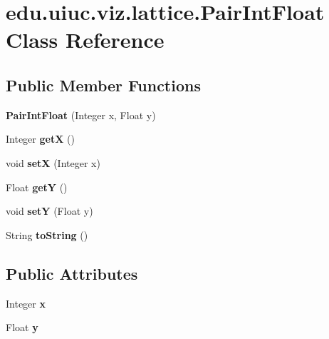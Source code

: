 \hypertarget{classedu_1_1uiuc_1_1viz_1_1lattice_1_1_pair_int_float}{}\section{edu.\+uiuc.\+viz.\+lattice.\+Pair\+Int\+Float Class Reference}
\label{classedu_1_1uiuc_1_1viz_1_1lattice_1_1_pair_int_float}
\subsection*{Public Member Functions}
\begin{DoxyCompactItemize}
\item 
\mbox{\label{classedu_1_1uiuc_1_1viz_1_1lattice_1_1_pair_int_float_a962588ce1ce34cc83889f68fc17846a9}} 
{\bfseries Pair\+Int\+Float} (Integer x, Float y)
\item 
\mbox{\label{classedu_1_1uiuc_1_1viz_1_1lattice_1_1_pair_int_float_a8431287a1ab3f4aa9521a6b7fe7ad163}} 
Integer {\bfseries getX} ()
\item 
\mbox{\label{classedu_1_1uiuc_1_1viz_1_1lattice_1_1_pair_int_float_ae7b02985752132e7c1141aeac4d572be}} 
void {\bfseries setX} (Integer x)
\item 
\mbox{\label{classedu_1_1uiuc_1_1viz_1_1lattice_1_1_pair_int_float_aa6f86840060460b243ffd1c1cbf01800}} 
Float {\bfseries getY} ()
\item 
\mbox{\label{classedu_1_1uiuc_1_1viz_1_1lattice_1_1_pair_int_float_aec16f8d9918d0e181a363457dbc3cf07}} 
void {\bfseries setY} (Float y)
\item 
\mbox{\label{classedu_1_1uiuc_1_1viz_1_1lattice_1_1_pair_int_float_a5396524ee40bb327429cb3d7d2a3b7df}} 
String {\bfseries to\+String} ()
\end{DoxyCompactItemize}
\subsection*{Public Attributes}
\begin{DoxyCompactItemize}
\item 
\mbox{\label{classedu_1_1uiuc_1_1viz_1_1lattice_1_1_pair_int_float_af51a8d87f6e187b82ee2a7db0bdee968}} 
Integer {\bfseries x}
\item 
\mbox{\label{classedu_1_1uiuc_1_1viz_1_1lattice_1_1_pair_int_float_a96d756202f6b7d8b7f1457d1f996286d}} 
Float {\bfseries y}
\end{DoxyCompactItemize}


